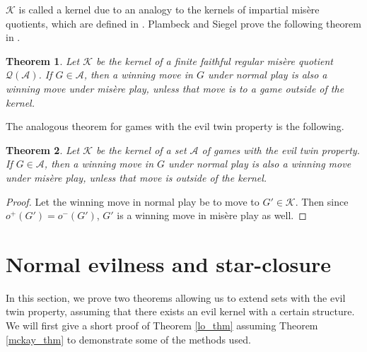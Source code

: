 \documentclass{amsart}
\theoremstyle{plain}
\newtheorem{thm}{Theorem}
\theoremstyle{definition}
\theoremstyle{remark}
\numberwithin{equation}{section}
\numberwithin{thm}{section}
\begin{document}
 $\mathscr{K}$ is called a kernel due to an analogy to the kernels of impartial mis\`ere quotients, which are defined in \cite{plambeck2008misere}. Plambeck and Siegel prove the following theorem in \cite{plambeck2008misere}.
 \begin{thm}
     Let $\mathscr{K}$ be the kernel of a finite faithful regular mis\`ere quotient $\mathcal{Q} (\mathscr{A})$. If $G \in \mathscr{A}$, then a winning move in $G$ under normal play is also a winning move under mis\`ere play, unless that move is to a game outside of the kernel.
\end{thm}
The analogous theorem for games with the evil twin property is the following.
\begin{thm}
    Let $\mathscr{K}$ be the kernel of a set $\mathscr{A}$ of games with the evil twin property. If $G \in \mathscr{A}$, then a winning move in $G$ under normal play is also a winning move under mis\`ere play, unless that move is outside of the kernel.
\end{thm}
\begin{proof}
    Let the winning move in normal play be to move to $G' \in \mathscr{K}$. Then since $o^+(G') = o^-(G')$, $G'$ is a winning move in mis\`ere play as well.
\end{proof}

\section{Normal evilness and star-closure}
\label{4}
In this section, we prove two theorems allowing us to extend sets with the evil twin property, assuming that there exists an evil kernel with a certain structure. 
We will first give a short proof of Theorem \ref{lo_thm} assuming Theorem \ref{mckay_thm} to demonstrate some of the methods used.
\end{document}
